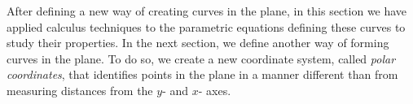 After defining a new way of creating curves in the plane, in this section we have applied calculus techniques to the parametric equations defining these curves to study their properties. In the next section, we define another way of forming curves in the plane. To do so, we create a new coordinate system, called \emph{polar coordinates}, that identifies points in the plane in a manner different than from measuring distances from the $y$- and $x$- axes.

